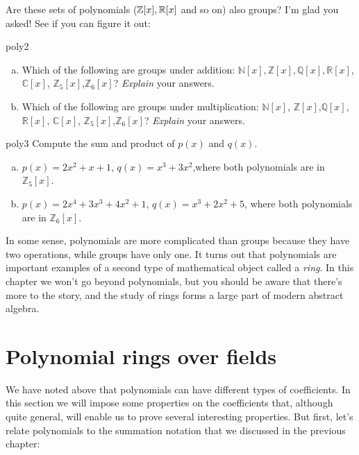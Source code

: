 Are these sets of polynomials ($\mathbb{Z}[x], \mathbb{R}[x]$ and so on) also groups? I'm glad you asked! See if you can figure it out:

\begin{exercise}{poly2}
\begin{enumerate}[(a)]
\item
Which of the following are groups under addition: $\mathbb{N}[x], \mathbb{Z}[x], \mathbb{Q}[x], \mathbb{R}[x]$, $\mathbb{C}[x]$, $\mathbb{Z}_5[x]$,$\mathbb{Z}_6[x]$? \emph{Explain} your answers. 
\item
Which of the following are groups under multiplication: $\mathbb{N}[x]$, $\mathbb{Z}[x]$,$\mathbb{Q}[x]$,$\mathbb{R}[x]$, $\mathbb{C}[x]$, $\mathbb{Z}_5[x]$,$\mathbb{Z}_6[x]$? 
\emph{Explain} your answers.
\end{enumerate}
\end{exercise}

\begin{exercise}{poly3}
Compute the sum and product of $p(x)$ and $q(x)$.
\begin{enumerate}[(a)]
\item
$p(x)= 2x^2 + x + 1$, $q(x)=x^3 +3x^2$,where both polynomials are in $\mathbb{Z}_5[x]$.
\item
$p(x)= 2x^4 + 3x^3 + 4x^2+1$, $q(x)=x^3 +2x^2+5$, where both polynomials are in $\mathbb{Z}_6[x]$.
\end{enumerate}
\end{exercise}

In some sense, polynomials are more complicated than groups because they have two operations, while groups have only one. It turns out that polynomials are important examples of a second type of mathematical object called a \emph{ring}.
In this chapter we won't go beyond polynomials, but you should be aware that there's more to the story, and the study of rings forms a large part of modern abstract algebra.

\section {Polynomial rings over fields\quad
{}}
 We have noted above that polynomials can have different types of coefficients. 
In this section we will  impose some properties on the coefficients that, although quite general, will enable us to prove several interesting properties. But first, let's relate polynomials to the summation notation that we discussed in the previous chapter:

